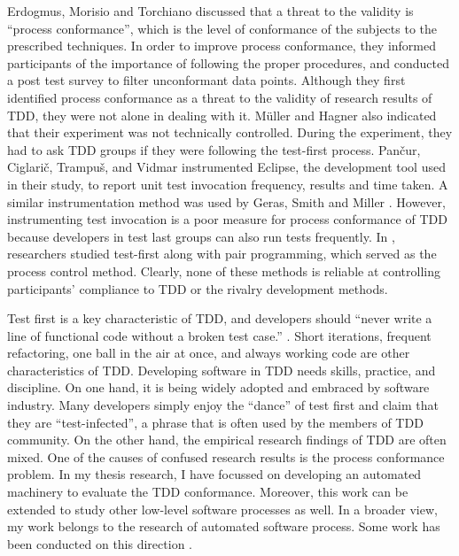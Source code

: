 \documentclass[smallextended]{svjour3}     %
\begin{document}
Erdogmus, Morisio and Torchiano \cite{Erdogmus:05} discussed that
a threat to the validity is ``process conformance'',
which is the level of conformance of the subjects
to the prescribed techniques. In order to improve process conformance,
they informed participants of the importance of following the 
proper procedures, and conducted a post test survey to filter 
unconformant data points\cite{Erdogmus:05}. Although they first
identified process conformance as a threat to the validity 
of research results of TDD, they were not alone in 
dealing with it. M\"uller and Hagner \cite{Muller:02} also 
indicated that their experiment was not technically controlled. 
During the experiment, they had to ask TDD groups if they were
following the test-first process. Pan\v{c}ur, Ciglari\v{c}, 
Trampu\v{s}, and Vidmar \cite{Matjaz:03} instrumented Eclipse, 
the development tool used in their study, to report unit test 
invocation frequency, results and time taken. A similar 
instrumentation method was used by Geras, Smith and Miller 
\cite{Geras:04}. However, instrumenting test invocation is 
a poor measure for process conformance of TDD because developers 
in test last groups can also run tests frequently. In 
\cite{George:03,Williams:03,Maximilien:03}, researchers studied 
test-first along with pair programming, which served as the 
process control method. Clearly, none of these methods is 
reliable at controlling participants' compliance to TDD or 
the rivalry development methods. 

Test first is a key characteristic of TDD, and developers 
should ``never write a line of functional code without a broken 
test case.'' \cite{Beck:01}. Short iterations, frequent 
refactoring, one ball in the air at once, and always working 
code are other characteristics of TDD. Developing software in 
TDD needs skills, practice, and discipline. On one hand, it is 
being widely adopted and embraced by software industry. Many 
developers simply enjoy the ``dance'' of test first and claim that
they are ``test-infected'', a phrase that is often used by the 
members of TDD community. On the other hand, the empirical research 
findings of TDD are often mixed. One of the causes of 
confused research results is the process conformance problem. 
In my thesis research, I have focussed on developing an automated 
machinery to evaluate the TDD conformance. Moreover, this work 
can be extended to study other low-level software processes as 
well. In a broader view, my work belongs to the research of automated 
software process. Some work has been conducted on this 
direction \cite{Cook:95,Cook:96,Jensen:04,Jensen:05}.
\end{document}
